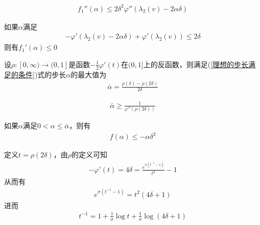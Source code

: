             \begin{lemma}
            \begin{align*}
            f_1''(\alpha)\leqslant 2{\delta}^2{\varphi}''({\lambda}_2(v)-2\alpha\delta)
            \end{align*}
            \end{lemma}
            \begin{lemma}
            如果$\alpha$满足
            \begin{align}
            \label{理想的步长满足的条件}
            -{\varphi}'({\lambda}_2(v)-2\alpha\delta)+{\varphi}'({\lambda}_2(v))\leqslant 2\delta
            \end{align}
            则有$f_1'(\alpha)\leqslant 0$
            \end{lemma}
            \begin{lemma}
            设$\rho:[0,\infty)\to(0,1]$是函数$-\frac 12 {\varphi}'(t)$在$(0,1]$上的反函数，则满足(\ref{理想的步长满足的条件})式的步长$\alpha$的最大值为
            \begin{align*}
            \bar{\alpha}=\frac{\rho(\delta)-\rho(2\delta)}{2\delta}
            \end{align*}
            \end{lemma}
            \begin{lemma}
            \begin{align*}
            \bar{\alpha} \geqslant \frac{1}{{\varphi}''(\rho(2\delta))}
            \end{align*}
            \end{lemma}
            \begin{lemma}
            如果$\alpha$满足$0<\alpha\leqslant \bar{\alpha}$，则有
            \begin{align*}
            f({\alpha}) \leqslant -\alpha{\delta}^2
            \end{align*}
            \end{lemma}
            \par
            定义$t=\rho(2\delta)$，由$\rho$的定义可知
            \begin{align*}
            -{\varphi}'(t) = 4\delta=\frac{e^{\sigma(t^{-1}-1)}}{t^2}-1
            \end{align*}
            从而有
            \begin{align*}
            e^{\sigma(t^{-1}-1)} = t^2(4\delta +1)
            \end{align*}
            进而
            \begin{align*}
            t^{-1} = 1+\frac{1}{\sigma}\log{t}+\frac{1}{\sigma}\log(4\delta +1)
            \end{align*}
